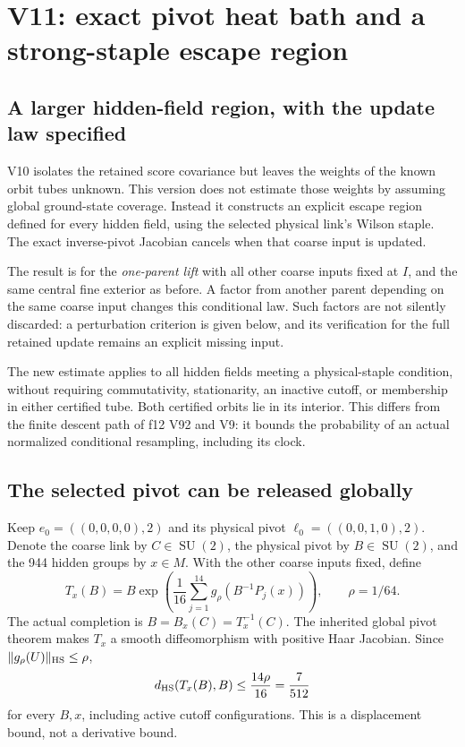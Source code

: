 \documentclass[11pt,oneside]{article}
\DeclareMathOperator{\SU}{SU}
\begin{document}
\section{V11: exact pivot heat bath and a strong-staple escape region}
\label{sec:f13v11}

\subsection{A larger hidden-field region, with the update law specified}

V10 isolates the retained score covariance but leaves
the weights of the known orbit tubes unknown. This
version does not estimate those weights by assuming
global ground-state coverage. Instead it constructs
an explicit escape region defined for every hidden
field, using the selected physical link's Wilson
staple. The exact inverse-pivot Jacobian cancels when
that coarse input is updated.

The result is for the \emph{one-parent lift} with all
other coarse inputs fixed at \(I\), and the same central
fine exterior as before. A factor from another parent
depending on the same coarse input changes this
conditional law. Such factors are not silently
discarded: a perturbation criterion is given below,
and its verification for the full retained update
remains an explicit missing input.

The new estimate applies to all hidden fields meeting
a physical-staple condition, without requiring
commutativity, stationarity, an inactive cutoff, or
membership in either certified tube. Both certified
orbits lie in its interior. This differs from the
finite descent path of f12 V92 and V9: it bounds the
probability of an actual normalized conditional
resampling, including its clock.

\subsection{The selected pivot can be released globally}

Keep \(e_0=((0,0,0,0),2)\) and its physical pivot
\(\ell_0=((0,0,1,0),2)\). Denote the coarse link by
\(C\in\SU(2)\), the physical pivot by \(B\in\SU(2)\),
and the 944 hidden groups by \(x\in M\). With the
other coarse inputs fixed, define
\begin{equation}\label{eq:f13v11-forward}
 T_x(B)=B\exp\!\left(
       \frac1{16}\sum_{j=1}^{14}g_\rho(B^{-1}P_j(x))
                      \right),\qquad \rho=1/64 .
\end{equation}
The actual completion is \(B=B_x(C)=T_x^{-1}(C)\).
The inherited global pivot theorem makes \(T_x\)
a smooth diffeomorphism with positive Haar Jacobian.
Since \(\|g_\rho(U)\|_{\rm HS}\le\rho\),
\begin{equation}\label{eq:f13v11-displacement}
 d_{\rm HS}(T_x(B),B)\le\frac{14\rho}{16}
                                      =\frac7{512}
\end{equation}
for every \(B,x\), including active cutoff configurations.
This is a displacement bound, not a derivative bound.
\end{document}
